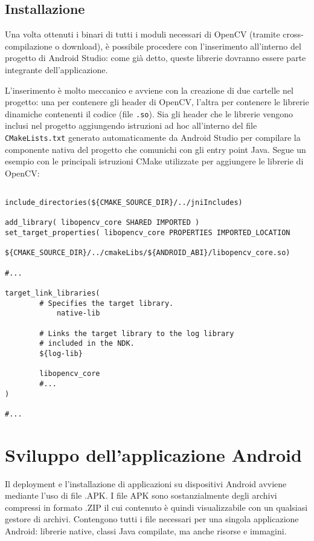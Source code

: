 \subsection{Installazione}

Una volta ottenuti i binari di tutti i moduli necessari di OpenCV (tramite cross-compilazione o download), è possibile
procedere con l'inserimento all'interno del progetto di Android Studio: come già detto, queste librerie dovranno essere 
parte integrante dell'applicazione.

L'inserimento è molto meccanico e avviene con la creazione di due cartelle nel progetto: una per contenere gli header di
OpenCV, l'altra per contenere le librerie dinamiche contenenti il codice (file \texttt{.so}).
Sia gli header che le librerie vengono inclusi nel progetto aggiungendo istruzioni ad hoc all'interno del file 
\texttt{CMakeLists.txt} generato automaticamente da Android Studio per compilare la componente nativa del progetto che
comunichi con gli entry point Java.
Segue un esempio con le principali istruzioni CMake utilizzate per aggiungere le librerie di OpenCV:

\begin{verbatim}

include_directories(${CMAKE_SOURCE_DIR}/../jniIncludes)

add_library( libopencv_core SHARED IMPORTED )
set_target_properties( libopencv_core PROPERTIES IMPORTED_LOCATION
        ${CMAKE_SOURCE_DIR}/../cmakeLibs/${ANDROID_ABI}/libopencv_core.so)

#...

target_link_libraries( 
        # Specifies the target library.
            native-lib

        # Links the target library to the log library
        # included in the NDK.
        ${log-lib}

        libopencv_core
        #...
)

#...
\end{verbatim}

\section{Sviluppo dell'applicazione Android}

Il deployment e l'installazione di applicazioni su dispositivi Android avviene mediante l'uso di file .APK.
I file APK sono sostanzialmente degli archivi compressi in formato .ZIP il cui contenuto è quindi visualizzabile con
un qualsiasi gestore di archivi. Contengono tutti i file necessari per una singola applicazione Android: librerie native,
classi Java compilate, ma anche risorse e immagini.

